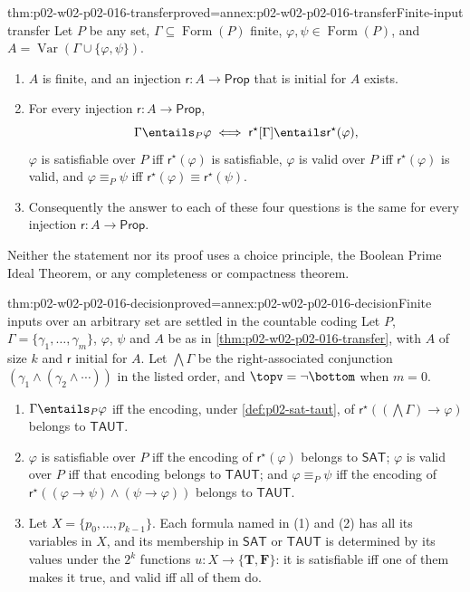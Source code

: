 \begin{hbtheorem}{thm:p02-w02-p02-016-transfer}{proved=annex:p02-w02-p02-016-transfer}{Finite-input transfer}
Let \(P\) be any set, \(\Gamma\subseteq\operatorname{Form}(P)\) finite,
\(\varphi,\psi\in\operatorname{Form}(P)\), and
\(A=\operatorname{Var}(\Gamma\cup\{\varphi,\psi\})\).
\begin{enumerate}
\item \(A\) is finite, and an injection \(\mathsf r:A\to\mathsf{Prop}\) that is
      initial for \(A\) exists.
\item For every injection \(\mathsf r:A\to\mathsf{Prop}\),
      \[
       \Gamma\entails_P\varphi
       \iff
       \mathsf r^{\star}[\Gamma]\entails\mathsf r^{\star}(\varphi),
      \]
      \(\varphi\) is satisfiable over \(P\) iff \(\mathsf r^{\star}(\varphi)\) is
      satisfiable, \(\varphi\) is valid over \(P\) iff
      \(\mathsf r^{\star}(\varphi)\) is valid, and
      \(\varphi\equiv_P\psi\) iff
      \(\mathsf r^{\star}(\varphi)\equiv\mathsf r^{\star}(\psi)\).
\item Consequently the answer to each of these four questions is the same for
      every injection \(\mathsf r:A\to\mathsf{Prop}\).
\end{enumerate}
Neither the statement nor its proof uses a choice principle, the Boolean
Prime Ideal Theorem, or any completeness or compactness theorem.
\end{hbtheorem}

\begin{hbcorollary}{thm:p02-w02-p02-016-decision}{proved=annex:p02-w02-p02-016-decision}{Finite inputs over an arbitrary set are settled in the countable coding}
Let \(P\), \(\Gamma=\{\gamma_1,\ldots,\gamma_m\}\), \(\varphi\), \(\psi\) and
\(A\) be as in \cref{thm:p02-w02-p02-016-transfer}, with \(A\) of size \(k\)
and \(\mathsf r\) initial for \(A\).  Let \(\bigwedge\Gamma\) be the
right-associated conjunction \((\gamma_1\land(\gamma_2\land\cdots))\) in the
listed order, and \(\topv=\neg\bottom\) when \(m=0\).
\begin{enumerate}
\item \(\Gamma\entails_P\varphi\) iff the encoding, under
      \cref{def:p02-sat-taut}, of
      \(\mathsf r^{\star}((\bigwedge\Gamma)\to\varphi)\) belongs to
      \(\mathsf{TAUT}\).
\item \(\varphi\) is satisfiable over \(P\) iff the encoding of
      \(\mathsf r^{\star}(\varphi)\) belongs to \(\mathsf{SAT}\); \(\varphi\) is
      valid over \(P\) iff that encoding belongs to \(\mathsf{TAUT}\); and
      \(\varphi\equiv_P\psi\) iff the encoding of
      \(\mathsf r^{\star}((\varphi\to\psi)\land(\psi\to\varphi))\) belongs to
      \(\mathsf{TAUT}\).
\item Let \(X=\{p_0,\ldots,p_{k-1}\}\).  Each formula named in (1) and (2)
      has all its variables in \(X\), and its membership in \(\mathsf{SAT}\) or
      \(\mathsf{TAUT}\) is determined by its values under the \(2^k\)
      functions \(u:X\to\{\mathbf T,\mathbf F\}\): it is
      satisfiable iff one of them makes it true, and valid iff all of them do.
\end{enumerate}
\end{hbcorollary}

